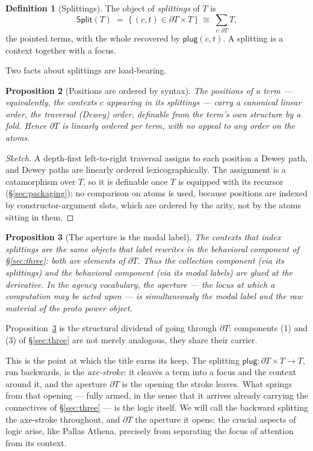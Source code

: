 \documentclass[11pt]{article}
\theoremstyle{definition}
\newtheorem{definition}{Definition}[section]
\theoremstyle{plain}
\newtheorem{proposition}[definition]{Proposition}
\newcommand{\p}{\partial}
\newcommand{\T}{T}
\newcommand{\plug}{\mathsf{plug}}
\newcommand{\Split}{\mathsf{Split}}
\begin{document}
\begin{definition}[Splittings]
The object of \emph{splittings} of $\T$ is
\[
  \Split(\T) \;=\; \{\, (c,t) \in \p\T \times \T \,\}
             \;\cong\; \textstyle\sum_{c:\p\T} \T,
\]
the pointed terms, with the whole recovered by $\plug(c,t)$. A splitting is a
context together with a focus.
\end{definition}

Two facts about splittings are load-bearing.

\begin{proposition}[Positions are ordered by syntax]
\label{prop:dewey}
The positions of a term --- equivalently, the contexts $c$ appearing in its
splittings --- carry a canonical linear order, the traversal (Dewey) order,
definable from the term's own structure by a fold. Hence $\p\T$ is linearly
ordered \emph{per term}, with no appeal to any order on the atoms.
\end{proposition}

\begin{proof}[Sketch]
A depth-first left-to-right traversal assigns to each position a Dewey path,
and Dewey paths are linearly ordered lexicographically. The assignment is a
catamorphism over $\T$, so it is definable once $\T$ is equipped with its
recursor (\S\ref{sec:packaging}); no comparison on atoms is used, because
positions are indexed by constructor-argument slots, which are ordered by the
arity, not by the atoms sitting in them.
\end{proof}

\begin{proposition}[The aperture is the modal label]
\label{prop:glue}
The contexts that index splittings are the same objects that label rewrites in
the behavioral component of \S\ref{sec:three}: both are elements of $\p\T$.
Thus the collection component (via its splittings) and the behavioral
component (via its modal labels) are glued at the derivative. In the agency
vocabulary, the aperture --- the locus at which a computation may be acted
upon --- is simultaneously the modal label and the raw material of the proto
power object.
\end{proposition}

Proposition~\ref{prop:glue} is the structural dividend of going through $\p\T$:
components (1) and (3) of \S\ref{sec:three} are not merely analogous, they
share their carrier.

This is the point at which the title earns its keep. The splitting
$\plug : \p\T\times\T \to \T$, run backwards, is the \emph{axe-stroke}: it
cleaves a term into a focus and the context around it, and the aperture $\p\T$
is the opening the stroke leaves. What springs from that opening --- fully
armed, in the sense that it arrives already carrying the connectives of
\S\ref{sec:three} --- is the logic itself. We will call the backward splitting
the axe-stroke throughout, and $\p\T$ the aperture it opens; the crucial
aspects of logic arise, like Pallas Athena, precisely from separating the
focus of attention from its context.
\end{document}
